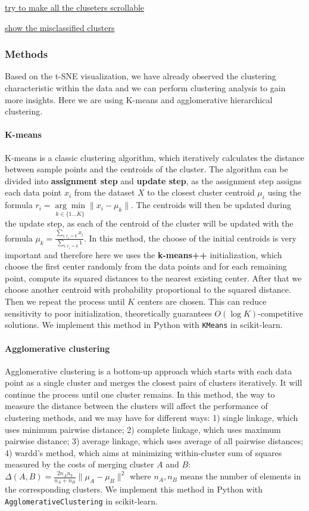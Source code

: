 \documentclass{article}
\begin{document}
\underline{try to make all the cluseters scrollable}

\underline{show the misclassified clusters}

\subsubsection*{Methods}

Based on the t-SNE visualization, we have already observed the clustering characteristic within the data and we can perform clustering analysis to gain more insights. Here we are using K-means and agglomerative hierarchical clustering.

\paragraph{K-means} K-means is a classic clustering algorithm, which iteratively calculates the distance between sample points and the centroids of the cluster. The algorithm can be divided into \textbf{assignment step} and \textbf{update step}, as the assignment step assigns each data point $x_i$ from the dataset $X$ to the closest cluster centroid $\mu_i$ using the formula $r_i = \underset{k\in \{1\ldots K\} }{\arg\min}{ \|x_{i}-\mu_k\| }$. The centroids will then be updated during the
update step, as each of the centroid of the cluster will be updated with the formula $\mu_k = \frac{\sum_{i:r_i=k}^{} x_i}{\sum_{i:r_i=k}^{} 1}$. In this method, the choose of the initial centroids is very important and therefore here we uses the \textbf{k-means++} initialization, which choose the first center randomly from the data points and for each remaining point, compute its squared distances to the nearest existing center. After that we choose another centroid with
probability proportional to the squared distance. Then we repeat the process until $K$ centers are chosen. This can reduce sensitivity to poor initialization, theoretically guarantees $O(\log K)$-competitive solutions. We implement this method in Python with \texttt{KMeans} in scikit-learn.

\paragraph{Agglomerative clustering} Agglomerative clustering is a bottom-up approach which starts with each data point as a single cluster and merges the closest pairs of clusters iteratively. It will continue the process until one cluster remains. In this method, the way to measure the distance between the clusters will affect the performance of clustering methods, and we may have for different ways: 1) single linkage, which uses minimum pairwise distance; 2) complete linkage,
which uses maximum pairwise distance; 3) average linkage, which uses average of all pairwise distances; 4) wardd's method, which aims at minimizing within-cluster sum of squares measured by the costs of merging cluster $A$ and $B$: $\Delta(A, B)=\frac{2n_An_b}{n_A+n_B}\|\mu_A-\mu_B\|^2$ where $n_A, n_B$ means the number of elements in the corresponding clusters. We implement this method in Python with \texttt{AgglomerativeClustering} in scikit-learn.
\end{document}

